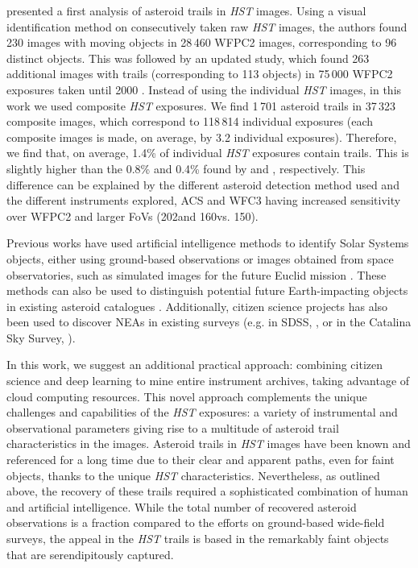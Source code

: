 \documentclass{aa}
\begin{document}
\citet{Evans1998} presented a first analysis of asteroid trails in \textit{HST} images. Using a visual identification method on consecutively taken raw \textit{HST} images, the authors found 230 images with moving objects in 28\,460 WFPC2 images, corresponding to 96 distinct objects. This was followed by an updated study, which found 263 additional images with trails (corresponding to 113 objects) in 75\,000 WFPC2 exposures taken until 2000 \citep{Evans2002}. Instead of using the individual \textit{HST} images, in this work we used composite \textit{HST} exposures. We find 1\,701 asteroid trails in 37\,323 composite images, which correspond to 118\,814 individual exposures (each composite images is made, on average, by 3.2 individual exposures). Therefore, we find that, on average, 1.4\% of individual \textit{HST} exposures contain trails. This is slightly higher than the 0.8\% and 0.4\% found by \citet{Evans1998} and \citet{Evans2002}, respectively. This difference can be explained by the different asteroid detection method used and the different instruments explored, ACS and WFC3 having increased sensitivity over WFPC2 and larger FoVs (202\arcsec and 160\arcsec vs. 150\arcsec). 

Previous works have used artificial intelligence methods to identify Solar Systems objects, either using ground-based observations \citep{Ivezic2001, Duev2019} or images obtained from space observatories, such as simulated images for the future Euclid mission \citep{Lieu2019}. These methods can also be used to distinguish potential future Earth-impacting objects in existing asteroid catalogues \citep{Hefele2020}. Additionally, citizen science projects has also been used to discover NEAs in existing surveys (e.g. in SDSS, \citealt{Solano2014}, or in the Catalina Sky Survey, \citealt{Beasley2013}).

In this work, we suggest an additional practical approach: combining citizen science and deep learning to mine entire instrument archives, taking advantage of cloud computing resources. This novel approach complements the unique challenges and capabilities of the \textit{HST} exposures: a variety of instrumental and observational parameters giving rise to a multitude of asteroid trail characteristics in the images. Asteroid trails in \textit{HST} images have been known and referenced for a long time due to their clear and apparent paths, even for faint objects, thanks to the unique \textit{HST} characteristics. Nevertheless, as outlined above, the recovery of these trails required a sophisticated combination of human and artificial intelligence. While the total number of recovered asteroid observations is a fraction compared to the efforts on ground-based wide-field surveys, the appeal in the \textit{HST} trails is based in the remarkably faint objects that are serendipitously captured.
\end{document}
